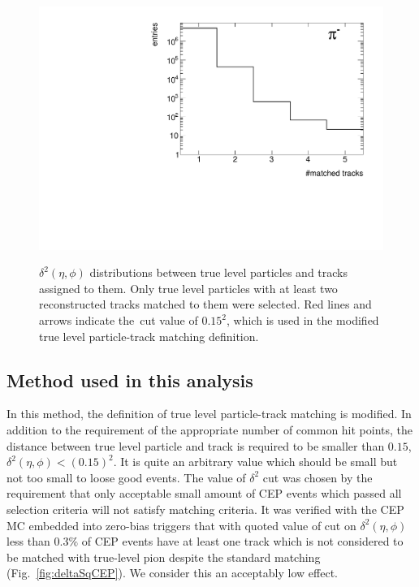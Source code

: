 \begin{figure}[h!]
{		\includegraphics[width=\linewidth,page=24]{graphics/eff/trackSplitting_CD.pdf}\\
	}%
	\caption[$\delta^{2}\left(\eta,\phi\right)$ distributions between true level particles and tracks assigned to them.]{$\delta^{2}\left(\eta,\phi\right)$ distributions between true level particles and tracks assigned to them. Only true level particles with at least two reconstructed tracks matched to them were selected. Red lines and arrows indicate  the~cut value of $0.15^2$, which is used in the modified true level particle-track matching definition.}\label{fig:trackSplittingNominalDelta_2}
\end{figure}




\subsection{Method used in this analysis}\label{subsec:definitionTrueLevelMatching}
In this method, the definition of true level particle-track matching is modified. In addition to the requirement of the appropriate number of common hit points, the distance between true level particle and track is required to be smaller than $0.15$, $\delta^{2}\left(\eta,\phi\right)<\left(0.15\right)^2$. It is quite an arbitrary value which should be small but not too small  to loose good events. The value of $\delta^2$ cut was chosen by the requirement that only acceptable small amount of CEP events which passed all selection criteria will not satisfy matching criteria. It was verified with the CEP MC embedded into zero-bias triggers that with quoted value of cut on $\delta^{2}\left(\eta,\phi\right)$ less than $0.3\%$ of CEP events have at least one track which is not considered to be matched with true-level pion despite the standard matching (Fig.~\ref{fig:deltaSqCEP}). We consider this an acceptably low effect.

